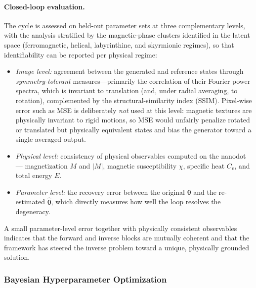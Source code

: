 \documentclass[letterpaper, 12, one column]{article}
\begin{document}
\paragraph{Closed-loop evaluation.}
The cycle is assessed on held-out parameter sets at three complementary levels, with the analysis stratified by the magnetic-phase clusters identified in the latent space (ferromagnetic, helical, labyrinthine, and skyrmionic regimes), so that identifiability can be reported per physical regime:
\begin{itemize}
\item[--] \emph{Image level:} agreement between the generated and reference states through \emph{symmetry-tolerant} measures---primarily the correlation of their Fourier power spectra, which is invariant to translation (and, under radial averaging, to rotation), complemented by the structural-similarity index (SSIM). Pixel-wise error such as MSE is deliberately \emph{not} used at this level: magnetic textures are physically invariant to rigid motions, so MSE would unfairly penalize rotated or translated but physically equivalent states and bias the generator toward a single averaged output.
\item[--] \emph{Physical level:} consistency of physical observables computed on the nanodot --- magnetization $M$ and $|M|$, magnetic susceptibility $\chi$, specific heat $C_v$, and total energy $E$.
\item[--] \emph{Parameter level:} the recovery error between the original $\boldsymbol{\theta}$ and the re-estimated $\hat{\boldsymbol{\theta}}$, which directly measures how well the loop resolves the degeneracy.
\end{itemize}
A small parameter-level error together with physically consistent observables indicates that the forward and inverse blocks are mutually coherent and that the framework has steered the inverse problem toward a unique, physically grounded solution.

\subsubsection{Bayesian Hyperparameter Optimization}
\end{document}
